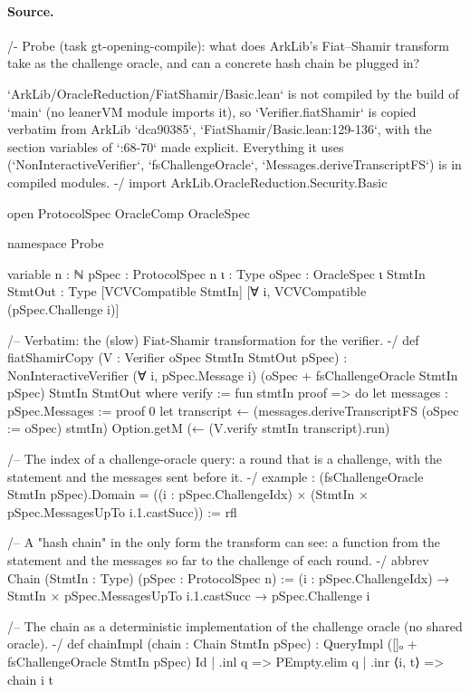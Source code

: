\paragraph{Source.}
\begin{leancode}
/-
Probe (task gt-opening-compile): what does ArkLib's Fiat–Shamir transform take as the challenge
oracle, and can a concrete hash chain be plugged in?

`ArkLib/OracleReduction/FiatShamir/Basic.lean` is not compiled by the build of `main` (no leanerVM
module imports it), so `Verifier.fiatShamir` is copied verbatim from ArkLib `dca90385`,
`FiatShamir/Basic.lean:129-136`, with the section variables of `:68-70` made explicit. Everything
it uses (`NonInteractiveVerifier`, `fsChallengeOracle`, `Messages.deriveTranscriptFS`) is in
compiled modules.
-/
import ArkLib.OracleReduction.Security.Basic

open ProtocolSpec OracleComp OracleSpec

namespace Probe

variable {n : ℕ} {pSpec : ProtocolSpec n} {ι : Type} {oSpec : OracleSpec ι}
  {StmtIn StmtOut : Type}
  [VCVCompatible StmtIn] [∀ i, VCVCompatible (pSpec.Challenge i)]

/-- Verbatim: the (slow) Fiat-Shamir transformation for the verifier. -/
def fiatShamirCopy (V : Verifier oSpec StmtIn StmtOut pSpec) :
    NonInteractiveVerifier (∀ i, pSpec.Message i) (oSpec + fsChallengeOracle StmtIn pSpec)
      StmtIn StmtOut where
  verify := fun stmtIn proof => do
    let messages : pSpec.Messages := proof 0
    let transcript ← (messages.deriveTranscriptFS (oSpec := oSpec) stmtIn)
    Option.getM (← (V.verify stmtIn transcript).run)

/-- The index of a challenge-oracle query: a round that is a challenge, with the statement and
the messages sent before it. -/
example : (fsChallengeOracle StmtIn pSpec).Domain
    = ((i : pSpec.ChallengeIdx) × (StmtIn × pSpec.MessagesUpTo i.1.castSucc)) := rfl

/-- A "hash chain" in the only form the transform can see: a function from the statement and the
messages so far to the challenge of each round. -/
abbrev Chain (StmtIn : Type) (pSpec : ProtocolSpec n) :=
  (i : pSpec.ChallengeIdx) → StmtIn × pSpec.MessagesUpTo i.1.castSucc → pSpec.Challenge i

/-- The chain as a deterministic implementation of the challenge oracle (no shared oracle). -/
def chainImpl (chain : Chain StmtIn pSpec) :
    QueryImpl ([]ₒ + fsChallengeOracle StmtIn pSpec) Id
  | .inl q => PEmpty.elim q
  | .inr ⟨i, t⟩ => chain i t


\end{leancode}
